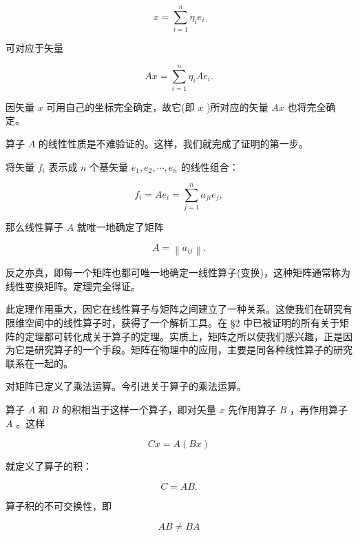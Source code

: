 \begin{equation*}
x = \sum_ {i = 1} ^ {n} \eta_ {i} e _ {i}
\end{equation*}

可对应于矢量

\begin{equation*}
A x = \sum_ {i = 1} ^ {n} \eta_ {i} A e _ {i}.
\end{equation*}

因矢量 $x$ 可用自己的坐标完全确定，故它(即 $x$ )所对应的矢量 $Ax$ 也将完全确定。

算子 $A$ 的线性性质是不难验证的。这样，我们就完成了证明的第一步。

将矢量 $f_{i}$ 表示成 $n$ 个基矢量 $e_{1}, e_{2}, \cdots, e_{n}$ 的线性组合：

\begin{equation*}
f _ {i} = A e _ {i} = \sum_ {j = 1} ^ {n} a _ {j i} e _ {j},
\end{equation*}

那么线性算子 $A$ 就唯一地确定了矩阵

\begin{equation*}
A = \left\| a _ {i j} \right\|.
\end{equation*}

反之亦真，即每一个矩阵也都可唯一地确定一线性算子(变换)，这种矩阵通常称为线性变换矩阵。定理完全得证。

此定理作用重大，因它在线性算子与矩阵之间建立了一种关系。这使我们在研究有限维空间中的线性算子时，获得了一个解析工具。在 §2 中已被证明的所有关于矩阵的定理都可转化成关于算子的定理。实质上，矩阵之所以使我们感兴趣，正是因为它是研究算子的一个手段。矩阵在物理中的应用，主要是同各种线性算子的研究联系在一起的。

对矩阵已定义了乘法运算。今引进关于算子的乘法运算。

算子 $A$ 和 $B$ 的积相当于这样一个算子，即对矢量 $x$ 先作用算子 $B$ ，再作用算子 $A$ 。这样

\begin{equation*}
C x = A (B x)
\end{equation*}

就定义了算子的积：

\begin{equation*}
C = A B.
\end{equation*}

算子积的不可交换性，即

\begin{equation*}
A B \neq B A
\end{equation*}

